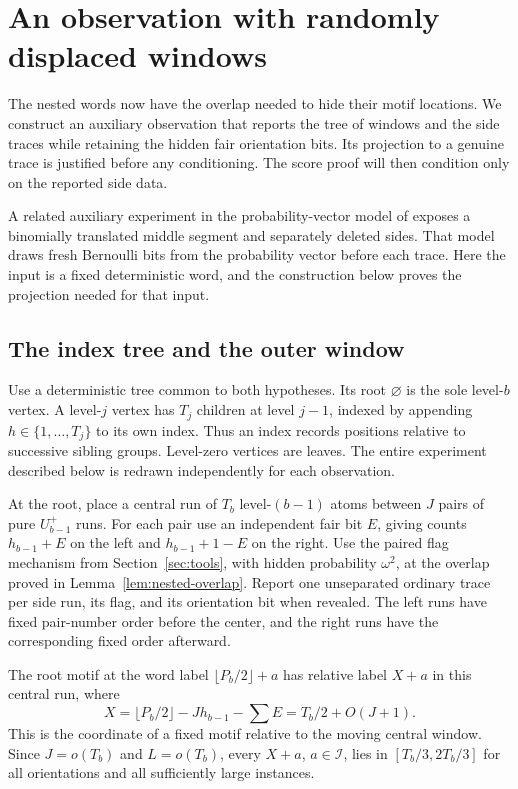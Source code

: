 \section{An observation with randomly displaced windows}\label{sec:layout}

The nested words now have the overlap needed to hide their motif locations.  We construct an auxiliary observation that reports the tree of windows and the side traces while retaining the hidden fair orientation bits.  Its projection to a genuine trace is justified before any conditioning.  The score proof will then condition only on the reported side data.

A related auxiliary experiment in the probability-vector model of \citet[Section 3, Lemmas 6--8]{RivkinValiantValiant2025} exposes a binomially translated middle segment and separately deleted sides.  That model draws fresh Bernoulli bits from the probability vector before each trace.  Here the input is a fixed deterministic word, and the construction below proves the projection needed for that input.

\subsection{The index tree and the outer window}

Use a deterministic tree common to both hypotheses.  Its root $\varnothing$ is the sole level-$b$ vertex.  A level-$j$ vertex has $T_j$ children at level $j-1$, indexed by appending $h\in\{1,\ldots,T_j\}$ to its own index.  Thus an index records positions relative to successive sibling groups.  Level-zero vertices are leaves.  The entire experiment described below is redrawn independently for each observation.

At the root, place a central run of $T_b$ level-$(b-1)$ atoms between $J$ pairs of pure $U_{b-1}^+$ runs.  For each pair use an independent fair bit $E$, giving counts $h_{b-1}+E$ on the left and $h_{b-1}+1-E$ on the right.  Use the paired flag mechanism from Section~\ref{sec:tools}, with hidden probability $\omega^2$, at the overlap proved in Lemma~\ref{lem:nested-overlap}.  Report one unseparated ordinary trace per side run, its flag, and its orientation bit when revealed.  The left runs have fixed pair-number order before the center, and the right runs have the corresponding fixed order afterward.

The root motif at the word label $\lfloor P_b/2\rfloor+a$ has relative label $X+a$ in this central run, where
\begin{equation}\label{eq:outer-anchor}
 X=\lfloor P_b/2\rfloor-Jh_{b-1}-\sum E
       =T_b/2+O(J+1).
\end{equation}
This is the coordinate of a fixed motif relative to the moving central window.  Since $J=o(T_b)$ and $L=o(T_b)$, every $X+a$, $a\in\mathcal I$, lies in $[T_b/3,2T_b/3]$ for all orientations and all sufficiently large instances.

